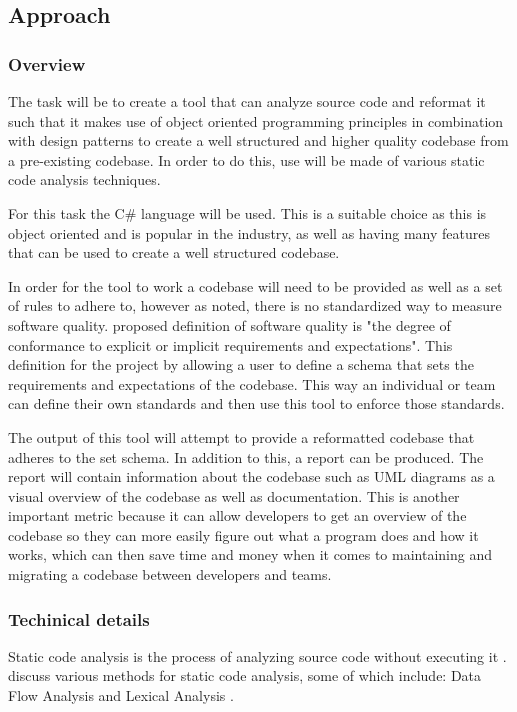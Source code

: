 \subsection{Approach}

\subsubsection{Overview}
The task will be to create a tool that can analyze source code and reformat it such that it makes use of object oriented programming principles in combination with design patterns to create a well structured and higher quality codebase from a pre-existing codebase. In order to do this, use will be made of various static code analysis techniques.

For this task the C\# language will be used. This is a suitable choice as this is object oriented and is popular in the industry, as well as having many features that can be used to create a well structured codebase.

In order for the tool to work a codebase will need to be provided as well as a set of rules to adhere to, however as noted, there is no standardized way to measure software quality. \cite{8681007} proposed definition of software quality is "the degree of conformance to explicit or implicit requirements and expectations". This definition for the project by allowing a user to define a schema that sets the requirements and expectations of the codebase. This way an individual or team can define their own standards and then use this tool to enforce those standards.

The output of this tool will attempt to provide a reformatted codebase that adheres to the set schema. In addition to this, a report can be produced. The report will contain information about the codebase such as UML diagrams as a visual overview of the codebase as well as documentation. This is another important metric because it can allow developers to get an overview of the codebase so they can more easily figure out what a program does and how it works, which can then save time and money when it comes to maintaining and migrating a codebase between developers and teams.

\subsubsection{Techinical details}
Static code analysis is the process of analyzing source code without executing it \citep{8802820}. \cite{owasp/StaticCodeAnalysis} discuss various methods for static code analysis, some of which include: Data Flow Analysis \citep{owasp/StaticCodeAnalysis} and Lexical Analysis \citep{owasp/StaticCodeAnalysis}.

